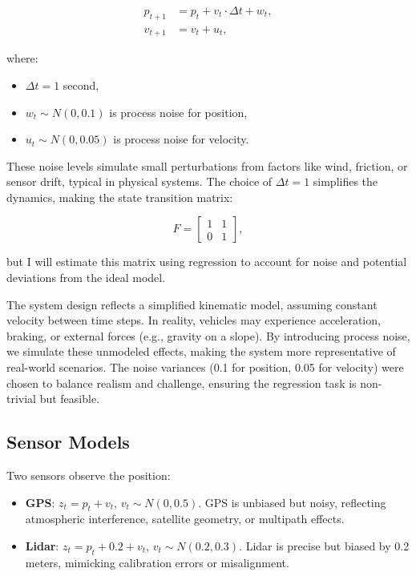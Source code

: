 \documentclass[12pt]{article}
\begin{document}
\begin{align}
    p_{t+1} &= p_t + v_t \cdot \Delta t + w_t, \label{eq:sim_position} \\
    v_{t+1} &= v_t + u_t, \label{eq:sim_velocity}
\end{align}

where:
\begin{itemize}
    \item \( \Delta t = 1 \) second,
    \item \( w_t \sim N(0, 0.1) \) is process noise for position,
    \item \( u_t \sim N(0, 0.05) \) is process noise for velocity.
\end{itemize}

These noise levels simulate small perturbations from factors like wind, friction, or sensor drift, typical in physical systems. The choice of \( \Delta t = 1 \) simplifies the dynamics, making the state transition matrix:

\begin{equation}
    F = \begin{bmatrix} 1 & 1 \\ 0 & 1 \end{bmatrix},
    \label{eq:sim_F}
\end{equation}

but I will estimate this matrix using regression to account for noise and potential deviations from the ideal model.

The system design reflects a simplified kinematic model, assuming constant velocity between time steps. In reality, vehicles may experience acceleration, braking, or external forces (e.g., gravity on a slope). By introducing process noise, we simulate these unmodeled effects, making the system more representative of real-world scenarios. The noise variances (0.1 for position, 0.05 for velocity) were chosen to balance realism and challenge, ensuring the regression task is non-trivial but feasible.

\subsection{Sensor Models}
\label{subsec:sensor_models}

Two sensors observe the position:
\begin{itemize}
    \item \textbf{GPS}: \( z_t = p_t + v_t \), \( v_t \sim N(0, 0.5) \). GPS is unbiased but noisy, reflecting atmospheric interference, satellite geometry, or multipath effects.
    \item \textbf{Lidar}: \( z_t = p_t + 0.2 + v_t \), \( v_t \sim N(0.2, 0.3) \). Lidar is precise but biased by 0.2 meters, mimicking calibration errors or misalignment.
\end{itemize}
\end{document}
